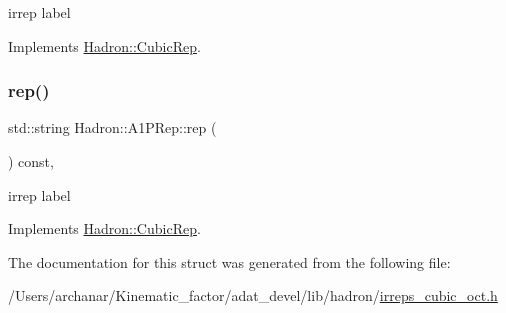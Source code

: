irrep label 

Implements \mbox{\hyperlink{structHadron_1_1CubicRep_ac3eb63608803d44c68681f158e14eb1b}{Hadron\+::\+Cubic\+Rep}}.

\mbox{\label{structHadron_1_1A1PRep_a8bacecde30050e482f468346bb51da28}} 
\subsubsection{\texorpdfstring{rep()}{rep()}\hspace{0.1cm}{\footnotesize\ttfamily [2/2]}}
{\footnotesize\ttfamily std\+::string Hadron\+::\+A1\+P\+Rep\+::rep (\begin{DoxyParamCaption}{ }\end{DoxyParamCaption}) const\hspace{0.3cm}{\ttfamily [inline]}, {\ttfamily [virtual]}}

irrep label 

Implements \mbox{\hyperlink{structHadron_1_1CubicRep_ac3eb63608803d44c68681f158e14eb1b}{Hadron\+::\+Cubic\+Rep}}.



The documentation for this struct was generated from the following file\+:\begin{DoxyCompactItemize}
\item 
/\+Users/archanar/\+Kinematic\+\_\+factor/adat\+\_\+devel/lib/hadron/\mbox{\hyperlink{lib_2hadron_2irreps__cubic__oct_8h}{irreps\+\_\+cubic\+\_\+oct.\+h}}\end{DoxyCompactItemize}
